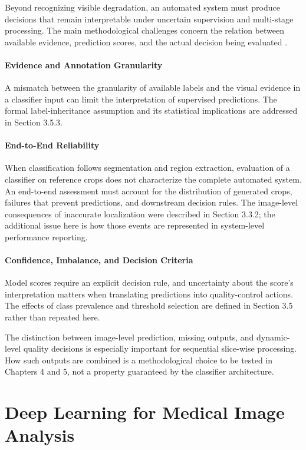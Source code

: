 Beyond recognizing visible degradation, an automated system must produce decisions that remain interpretable under uncertain supervision and multi-stage processing. The main methodological challenges concern the relation between available evidence, prediction scores, and the actual decision being evaluated \autocite{roecher2024motion,sanchez2024fetmrqc}.

\paragraph{Evidence and Annotation Granularity}
A mismatch between the granularity of available labels and the visual evidence in a classifier input can limit the interpretation of supervised predictions. The formal label-inheritance assumption and its statistical implications are addressed in Section 3.5.3.

\paragraph{End-to-End Reliability}
When classification follows segmentation and region extraction, evaluation of a classifier on reference crops does not characterize the complete automated system. An end-to-end assessment must account for the distribution of generated crops, failures that prevent predictions, and downstream decision rules. The image-level consequences of inaccurate localization were described in Section 3.3.2; the additional issue here is how those events are represented in system-level performance reporting.

\paragraph{Confidence, Imbalance, and Decision Criteria}
Model scores require an explicit decision rule, and uncertainty about the score's interpretation matters when translating predictions into quality-control actions. The effects of class prevalence and threshold selection are defined in Section 3.5 rather than repeated here.

The distinction between image-level prediction, missing outputs, and dynamic-level quality decisions is especially important for sequential slice-wise processing. How such outputs are combined is a methodological choice to be tested in Chapters 4 and 5, not a property guaranteed by the classifier architecture.

\section{Deep Learning for Medical Image Analysis}

